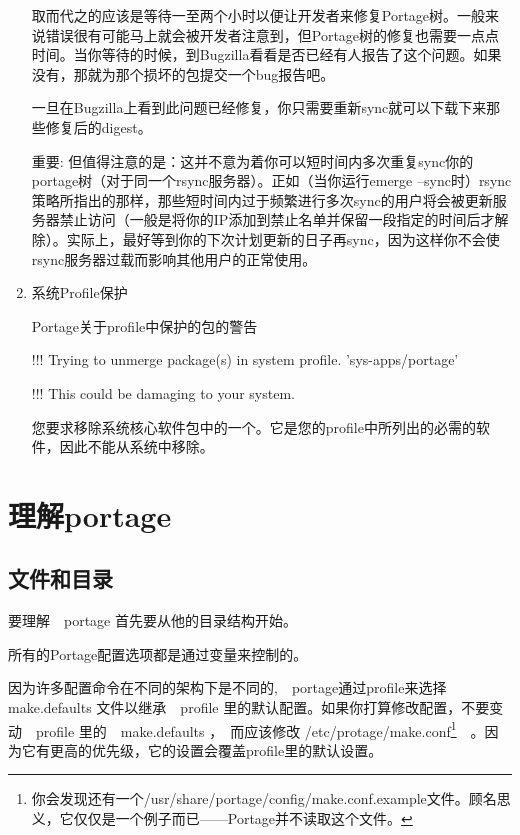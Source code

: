 \begin{enumerate}
取而代之的应该是等待一至两个小时以便让开发者来修复Portage树。一般来说错误很有可能马上就会被开发者注意到，但Portage树的修复也需要一点点时间。当你等待的时候，到Bugzilla看看是否已经有人报告了这个问题。如果没有，那就为那个损坏的包提交一个bug报告吧。

一旦在Bugzilla上看到此问题已经修复，你只需要重新sync就可以下载下来那些修复后的digest。

\begin{notice}
重要: 但值得注意的是：这并不意为着你可以短时间内多次重复sync你的portage树（对于同一个rsync服务器）。正如（当你运行emerge --sync时）rsync策略所指出的那样，那些短时间内过于频繁进行多次sync的用户将会被更新服务器禁止访问（一般是将你的IP添加到禁止名单并保留一段指定的时间后才解除）。实际上，最好等到你的下次计划更新的日子再sync，因为这样你不会使rsync服务器过载而影响其他用户的正常使用。
\end{notice}


\item 系统Profile保护

\begin{example}{Portage关于profile中保护的包的警告}
\begin{code}
!!! Trying to unmerge package(s) in system profile. 'sys-apps/portage'

!!! This could be damaging to your system.
\end{code}
\end{example}

您要求移除系统核心软件包中的一个。它是您的profile中所列出的必需的软件，因此不能从系统中移除。

\end{enumerate}

\section{理解portage}

\subsection{文件和目录}

要理解　portage 首先要从他的目录结构开始。

所有的Portage配置选项都是通过变量来控制的。

因为许多配置命令在不同的架构下是不同的,　portage通过profile来选择　make.defaults 文件以继承　profile 里的默认配置。如果你打算修改配置，不要变动　profile 里的　make.defaults ，　而应该修改 /etc/protage/make.conf\footnote{你会发现还有一个/usr/share/portage/config/make.conf.example文件。顾名思义，它仅仅是一个例子而已——Portage并不读取这个文件。}　。因为它有更高的优先级，它的设置会覆盖profile里的默认设置。

